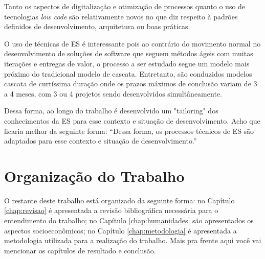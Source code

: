 		Tanto os aspectos de digitalização e otimização de processos quanto o uso de tecnologias \textit{low code} são relativamente novos no que diz respeito à padrões definidos
		de desenvolvimento, arquitetura ou boas práticas.
	
		O uso de técnicas de ES é interessante pois ao contrário do movimento normal no desenvolvimento de soluções de software que seguem métodos ágeis com muitas iterações e entregas
		de valor, o processo a ser estudado segue um modelo mais próximo do tradicional modelo de cascata. Entretanto, são conduzidos modelos cascata de curtíssima duração onde os prazos
		máximos de conclusão variam de 3 a 4 meses, com 3 ou 4 projetos sendo desenvolvidos simultâneamente.

		Dessa forma, ao longo do trabalho é desenvolvido um "tailoring" dos conhecimentos da ES para esse contexto e situação de desenvolvimento.
		{\color{red} Acho que ficaria melhor da seguinte forma: ``Dessa forma, os processos técnicos de ES são adaptados para esse contexto e situação de desenvolvimento.''}
	
	\section{Organização do Trabalho}\label{sec:introducao:organizacao}

		O restante deste trabalho está organizado da seguinte forma: no Capítulo \ref{chap:revisao} é apresentada a revisão bibliográfica necessária para o entendimento do trabalho; no Capítulo \ref{chap:humanidades} são apresentados os aspectos socioeconômicos; no Capítulo \ref{chap:metodologia} é apresentada a metodologia utilizada para a realização do trabalho. {\color{red} Mais pra frente aqui você vai mencionar os capítulos de resultado e conclusão.}
		
